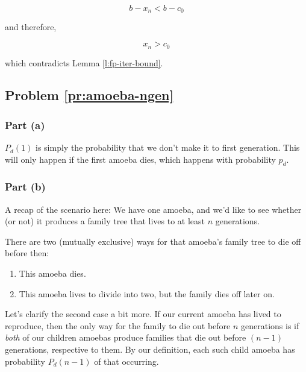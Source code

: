 \begin{equation*}
b - x_n < b - c_0
\end{equation*}

and therefore,

\begin{equation*}
x_n > c_0
\end{equation*}

which contradicts Lemma \ref{l:fp-iter-bound}.



 



\subsection{Problem \ref{pr:amoeba-ngen}}

\subsubsection{Part (a)}

$P_d(1)$ is simply the probability that we don't make it to first generation. This will only happen if the first amoeba dies, which happens with probability $p_d$.



\subsubsection{Part (b)}

A recap of the scenario here: We have one amoeba, and we'd like to see whether (or not) it produces a family tree that lives to at least $n$ generations.

There are two (mutually exclusive) ways for that amoeba's family tree to die off before then: 
\begin{enumerate}
\item This amoeba dies.
\item This amoeba lives to divide into two, but the family dies off later on.
\end{enumerate} \hfill

Let's clarify the second case a bit more. If our current amoeba has lived to reproduce, then the only way for the family to die out before $n$ generations is if \emph{both} of our children amoebas produce families that die out before $(n-1)$ generations, respective to them. By our definition, each such child amoeba has probability $P_d(n-1)$ of that occurring.

